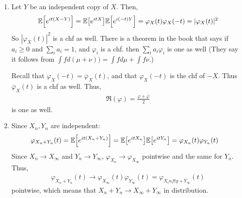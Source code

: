 \documentclass[12pt]{article}
\theoremstyle{definitionstyle}
\def\cph{\varphi}
\newcommand{\1}{\mathds 1}
\newcommand{\E}{\mathbb E \qty}
\begin{document}
\begin{enumerate}
        \item Let $Y$ be an independent copy of $X$. Then,
        \begin{align*}
            \E[e^{it(X-Y)}] = \E[e^{itX}]\E[e^{i(-t)Y}] = \cph_X(t) \cph_X(-t) = |\cph_X(t)|^2
        \end{align*}
        So $|\cph_X(t)|^2$ is a chf as well. There is a theorem in the book that says if $a_i \geq 0$ and $\sum_i a_i = 1$, and $\cph_i$ is a chf. then $\sum_i a_i\cph_i$ is one as well (They say it follows from $\int fd(\mu + \nu)) = \int fd\mu + \int f\nu$.) 

        Recall that $\cph_X(-t) = \overline \cph_X(t)$, and that $\cph_X(-t)$ is the chf of $-X$. Thus $\overline \cph_X(t)$ is a chf as well. Thus,
        \begin{align*}
            \Re(\cph) = \frac{\cph + \overline \cph}{2}
        \end{align*}
        is one as well.

        \item Since $X_n, Y_n$ are independent:
        \begin{align*}
            \cph_{X_n+Y_n}(t) = \E[e^{it(X_n+Y_n)}] &= \E[e^{itX_n}] \E[e^{itY_n}] = \cph_{X_n}(t) \cph_{Y_n}(t)
        \end{align*}
        Since $X_n \rightarrow X_\infty$ and $Y_n \rightarrow Y_\infty$, $\cph_{X_n} \to \cph_{X_\infty}$ pointwise and the same for $Y_n$. Thus,
        \begin{align*}
            \cph_{X_n+Y_n}(t) \to \cph_{X_\infty}(t) \cph_{Y_\infty}(t) = \cph_{X_infty + Y_\infty}(t)
        \end{align*}
        pointwise, which means that $X_n+Y_n \rightarrow X_\infty + Y_\infty$ in distribution.
    \end{enumerate}
\end{document}
